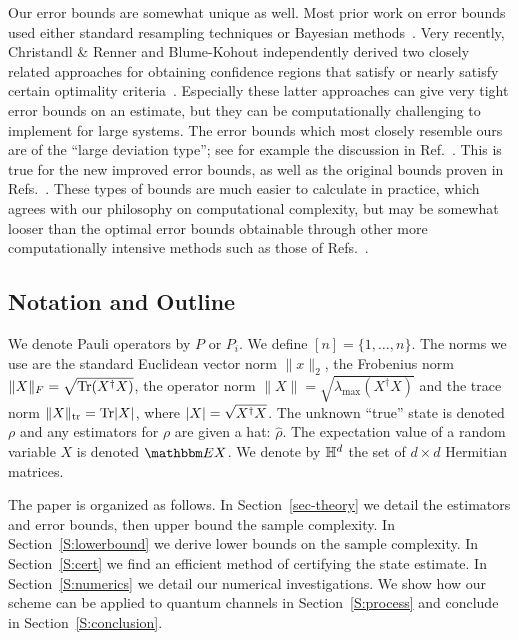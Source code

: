 Our error bounds are somewhat unique as well. Most prior work on error bounds used either standard resampling techniques or Bayesian methods~\cite{Jones1991, Buzek1998, Schack2001, Tanaka2005, Audenaert2009, Blume-Kohout2010a}. Very recently, Christandl \& Renner and Blume-Kohout independently derived two closely related approaches for obtaining confidence regions that satisfy or nearly satisfy certain optimality criteria~\cite{Christandl2011, Blume-Kohout2012}. Especially these latter approaches can give very tight error bounds on an estimate, but they can be computationally challenging to implement for large systems. The error bounds which most closely resemble ours are of the ``large deviation type''; see for example the discussion in Ref.~\cite{Sugiyama2011}. This is true for the new improved error bounds, as well as the original bounds proven in Refs.~\cite{Gross2010,Gross2011}. These types of bounds are much easier to calculate in practice, which agrees with our philosophy on computational complexity, but may be somewhat looser than the optimal error bounds obtainable through other more computationally intensive methods such as those of Refs.~\cite{Christandl2011, Blume-Kohout2012}. 


\subsection{Notation and Outline}


We denote Pauli operators by $P$ or $P_i$. We define $[n] = \{1,\ldots,n\}$. The norms we use are the standard Euclidean vector norm $\|x\|_2$, the Frobenius norm $\|X\|_F = \sqrt{\mathrm{Tr}(X^\dagger X)}$, the operator norm $\|X\| = \sqrt{\lambda_{\max}(X^\dagger X)}$ and the trace norm $\|X\|_{\mathrm{tr}} = \mathrm{Tr}\lvert X\rvert$, where $\lvert X\rvert = \sqrt{X^\dagger X}$. The unknown ``true'' state is denoted $\rho$ and any estimators for $\rho$ are given a hat: $\hat\rho$. The expectation value of a random variable $X$ is denoted $\EE X$. We denote by $\mathbb{H}^d$ the set of $d \times d$ Hermitian matrices.

The paper is organized as follows. In Section~\ref{sec-theory} we detail the estimators and error bounds, then upper bound the sample complexity. In Section~\ref{S:lowerbound} we derive lower bounds on the sample complexity. In Section~\ref{S:cert} we find an efficient method of certifying the state estimate. 
In Section~\ref{S:numerics} we detail our numerical investigations. We show how our scheme can be applied to quantum channels in Section~\ref{S:process} and conclude in Section~\ref{S:conclusion}.  

